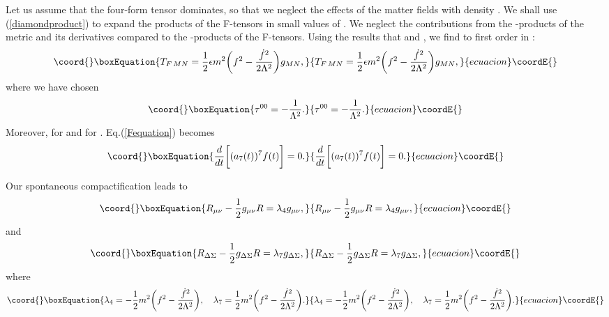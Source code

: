 \documentclass[a4paper,12pt]{article}
\begin{document}
Let us assume that the four-form tensor
\coordHE{} dominates, so that we neglect the effects of the
matter fields with density \coordHE{}. We shall use
(\ref{diamondproduct}) to expand the products of the F-tensors
in small values of \coordHE{}. We neglect the
contributions from the \myHighlight{$\diamondsuit$}\coordHE{}-products of the metric
\coordHE{} and its derivatives compared to the
\myHighlight{$\diamondsuit$}\coordHE{}-products of the F-tensors. Using the results that
\coordHE{} and
\coordHE{},
we find to first order in \myHighlight{$\vert\tau\vert$}\coordHE{}:
\begin{equation}\coord{}\boxEquation{
T_{F\,MN}=\frac{1}{2}\epsilon
m^2\biggl(f^2-\frac{{\dot f}^2}{2\Lambda^2}\biggr)g_{MN},
}{
T_{F\,MN}=\frac{1}{2}\epsilon
m^2\biggl(f^2-\frac{{\dot f}^2}{2\Lambda^2}\biggr)g_{MN},
}{ecuacion}\coordE{}\end{equation}
where we have chosen
\begin{equation}\coord{}\boxEquation{
\tau^{00}=-\frac{1}{\Lambda^2}.
}{
\tau^{00}=-\frac{1}{\Lambda^2}.
}{ecuacion}\coordE{}\end{equation}
Moreover, \coordHE{} for \coordHE{} and \coordHE{} for
\coordHE{}. Eq.(\ref{Fequation}) becomes
\begin{equation}\coord{}\boxEquation{
\frac{d}{dt}\biggl[(a_7(t))^7f(t)\biggr]=0.
}{
\frac{d}{dt}\biggl[(a_7(t))^7f(t)\biggr]=0.
}{ecuacion}\coordE{}\end{equation}

Our spontaneous compactification leads to
\begin{equation}\coord{}\boxEquation{
\label{R1} R_{\mu\nu}-\frac{1}{2}g_{\mu\nu}R=\lambda_4g_{\mu\nu},
}{
R_{\mu\nu}-\frac{1}{2}g_{\mu\nu}R=\lambda_4g_{\mu\nu},
}{ecuacion}\coordE{}\end{equation} and
\begin{equation}\coord{}\boxEquation{
\label{R2}
R_{\Delta\Sigma}-\frac{1}{2}g_{\Delta\Sigma}R=\lambda_7g_{\Delta\Sigma},
}{
R_{\Delta\Sigma}-\frac{1}{2}g_{\Delta\Sigma}R=\lambda_7g_{\Delta\Sigma},
}{ecuacion}\coordE{}\end{equation}
where
\begin{equation}\coord{}\boxEquation{
\lambda_4=-\frac{1}{2}m^2\biggl(f^2-\frac{{\dot
f}^2}{2\Lambda^2}\biggr),\quad \lambda_7
=\frac{1}{2}m^2\biggl(f^2-\frac{{\dot f}^2}{2\Lambda^2}\biggr).
}{
\lambda_4=-\frac{1}{2}m^2\biggl(f^2-\frac{{\dot
f}^2}{2\Lambda^2}\biggr),\quad \lambda_7
=\frac{1}{2}m^2\biggl(f^2-\frac{{\dot f}^2}{2\Lambda^2}\biggr).
}{ecuacion}\coordE{}\end{equation}
\end{document}
